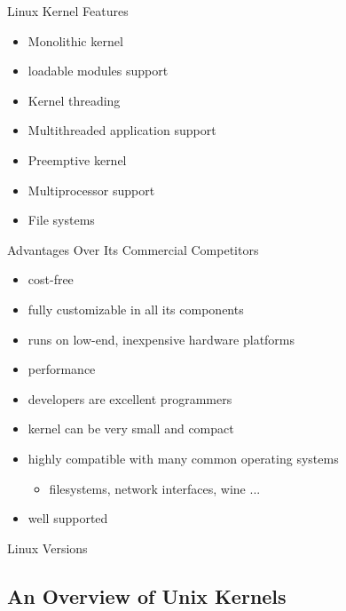 \begin{frame}
  \begin{block}{Linux Kernel Features}
    \begin{itemize}
    \item Monolithic kernel
    \item loadable modules support
    \item Kernel threading
    \item Multithreaded application support
    \item Preemptive kernel
    \item Multiprocessor support
    \item File systems
    \end{itemize}
  \end{block}
\end{frame}

\begin{frame}
  \begin{block}{Advantages Over Its Commercial Competitors}
    \begin{itemize}
    \item cost-free
    \item fully customizable in all its components
    \item runs on low-end, inexpensive hardware platforms
    \item performance
    \item developers are excellent programmers
    \item kernel can be very small and compact
    \item highly compatible with many common operating systems
      \begin{itemize}
      \item filesystems, network interfaces, wine ...
      \end{itemize}
    \item well supported
    \end{itemize}
  \end{block}
\end{frame}

\begin{frame}{Linux Versions}
  \begin{center}
  \end{center}
\end{frame}

\subsection{An Overview of Unix Kernels}

